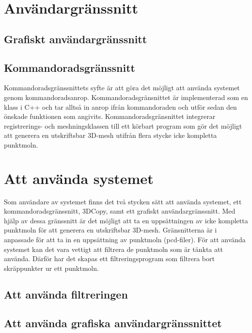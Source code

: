 \documentclass[a4paper,titlepage,12pt]{article}
\begin{document}
\section{Användargränssnitt}
	\subsection{Grafiskt användargränssnitt}
	
	\subsection{Kommandoradsgränssnitt}
		Kommandoradsgränssnittets syfte är att göra det möjligt att använda systemet genom kommandoradsanrop. Kommandoradsgränsnittet är implementerad som en klass i C++ och tar alltså in anrop ifrån kommandoraden och utför sedan den önskade funktionen som angivits. Kommandoradsgränsnittet integrerar registrerings- och meshningsklassen till ett körbart program som gör det möjligt att generera en utskriftsbar 3D-mesh utifrån flera stycke icke kompletta punktmoln.
	
\newpage

\section{Att använda systemet}
	Som användare av systemet finns det två stycken sätt att använda systemet, ett kommandoradsgränssnitt, 3DCopy, samt ett grafiskt användargränssnitt. Med hjälp av dessa gränssnitt är det möjligt att ta en uppsättningen av icke kompletta punktmoln för att generera en utskriftsbar 3D-mesh. Gränsnitterna är i anpassade för att ta in en uppsättning av punktmoln (pcd-filer). För att använda systemet kan det vara vettigt att filtrera de punktmoln som är tänkta att använda. Därför har det skapas ett filtreringsprogram som filtrera bort skräppunkter ur ett punktmoln.
	
	\subsection{Att använda filtreringen}
	
	\subsection{Att använda grafiska användargränssnittet}
	
\end{document}
